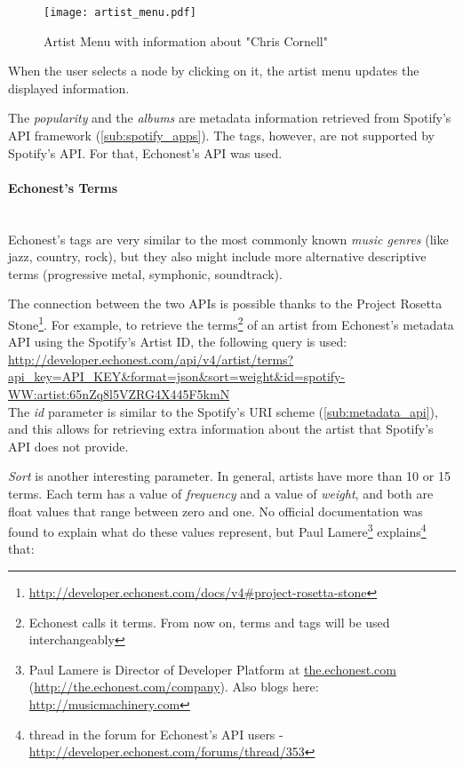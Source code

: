       \begin{figure}[tb]
        \begin{center}
          \texttt{[image: artist\_menu.pdf]}
        \end{center}
        \caption{Artist Menu with information about "Chris Cornell"}
        \label{fig:artist_menu}
      \end{figure}

      When the user selects a node by clicking on it, the artist menu updates the displayed information.

      The \emph{popularity} and the \emph{albums} are metadata information retrieved from Spotify's API framework (\ref{sub:spotify_apps}).
      The tags, however, are not supported by Spotify's API.
      For that, Echonest's API was used.

      \paragraph{Echonest's Terms} \hfill \\
      Echonest's tags are very similar to the most commonly known \emph{music genres} (like jazz, country, rock), but they also might include more alternative descriptive terms (progressive metal, symphonic, soundtrack).

      The connection between the two APIs is possible thanks to the Project Rosetta Stone\footnote{\url{http://developer.echonest.com/docs/v4\#project-rosetta-stone}}.
      For example, to retrieve the terms\footnote{Echonest calls it terms. From now on, terms and tags will be used interchangeably} of an artist from Echonest's metadata API using the Spotify's Artist ID, the following query is used: \\

      \url{
        http://developer.echonest.com/api/v4/artist/terms?api_key=API_KEY&format=json&sort=weight&id=spotify-WW:artist:65nZq8l5VZRG4X445F5kmN
      } \\

      The \emph{id} parameter is similar to the Spotify's URI scheme (\ref{sub:metadata_api}), and this allows for retrieving extra information about the artist that Spotify's API does not provide.

      \emph{Sort} is another interesting parameter. 
      In general, artists have more than 10 or 15 terms.
      Each term has a value of \emph{frequency} and a value of \emph{weight}, and both are float values that range between zero and one.
      No official documentation was found to explain what do these values represent, but Paul Lamere\footnote{Paul Lamere is Director of Developer Platform at \url{the.echonest.com} (\url{http://the.echonest.com/company}). Also blogs here: \url{http://musicmachinery.com}} explains\footnote{thread in the forum for Echonest's API users - \url{http://developer.echonest.com/forums/thread/353}} that:

